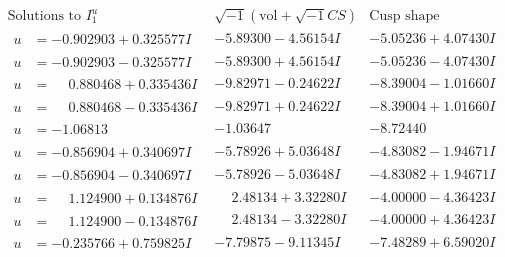 \documentclass[1p]{elsarticle_modified}
\theoremstyle{definition}
\newcommand{\I}{\sqrt{-1}}
\begin{document}
$$\begin{array}{c|c|c}  
\text{Solutions to }I^u_{1}& \I (\text{vol} + \sqrt{-1}CS) & \text{Cusp shape}\\
 \hline 
\begin{aligned}
u &= -0.902903 + 0.325577 I\end{aligned}
 & -5.89300 - 4.56154 I & -5.05236 + 4.07430 I \\ \hline\begin{aligned}
u &= -0.902903 - 0.325577 I\end{aligned}
 & -5.89300 + 4.56154 I & -5.05236 - 4.07430 I \\ \hline\begin{aligned}
u &= \phantom{-}0.880468 + 0.335436 I\end{aligned}
 & -9.82971 - 0.24622 I & -8.39004 - 1.01660 I \\ \hline\begin{aligned}
u &= \phantom{-}0.880468 - 0.335436 I\end{aligned}
 & -9.82971 + 0.24622 I & -8.39004 + 1.01660 I \\ \hline\begin{aligned}
u &= -1.06813\phantom{ +0.000000I}\end{aligned}
 & -1.03647\phantom{ +0.000000I} & -8.72440\phantom{ +0.000000I} \\ \hline\begin{aligned}
u &= -0.856904 + 0.340697 I\end{aligned}
 & -5.78926 + 5.03648 I & -4.83082 - 1.94671 I \\ \hline\begin{aligned}
u &= -0.856904 - 0.340697 I\end{aligned}
 & -5.78926 - 5.03648 I & -4.83082 + 1.94671 I \\ \hline\begin{aligned}
u &= \phantom{-}1.124900 + 0.134876 I\end{aligned}
 & \phantom{-}2.48134 + 3.32280 I & -4.00000 - 4.36423 I \\ \hline\begin{aligned}
u &= \phantom{-}1.124900 - 0.134876 I\end{aligned}
 & \phantom{-}2.48134 - 3.32280 I & -4.00000 + 4.36423 I \\ \hline\begin{aligned}
u &= -0.235766 + 0.759825 I\end{aligned}
 & -7.79875 - 9.11345 I & -7.48289 + 6.59020 I \\ \hline\begin{aligned}

\end{aligned}
\end{array}$$
\end{document}
